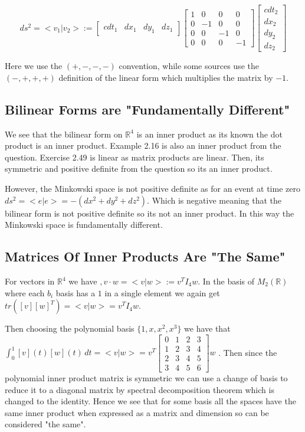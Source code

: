\documentclass{article}
\begin{document}
\begin{equation*}
    ds^2
    = <v_1|v_2>
    :=
    \begin{bmatrix}
        cdt_1 & dx_1 & dy_1 & dz_1
    \end{bmatrix}
    \begin{bmatrix}
        1 & 0 & 0 & 0 \\
        0 & -1 & 0 & 0 \\
        0 & 0 & -1 & 0 \\
        0 & 0 & 0 & -1
    \end{bmatrix}
    \begin{bmatrix}
        cdt_2 \\ dx_2 \\ dy_2 \\ dz_2
    \end{bmatrix}
\end{equation*}

Here we use the $(+,-,-,-)$ convention, while some sources\cite{Mink} use the $(-,+,+,+)$ definition of the linear form which multiplies the matrix by $-1$.

\subsection*{Bilinear Forms are "Fundamentally Different"}
We see that the bilinear form on $\mathbb{R}^4$ is an inner product as its known the dot product is an inner product. Example 2.16 is also an inner product from the question. Exercise 2.49 is linear as matrix products are linear. Then, its symmetric and positive definite from the question so its an inner product.

However, the Minkowski space is not positive definite as for an event at time zero $ds^2 = <e|e> = - (dx^2+dy^2+dz^2)$. Which is negative meaning that the bilinear form is not positive definite so its not an inner product. In this way the Minkowski space is fundamentally different.

\subsection*{Matrices Of Inner Products Are "The Same"}
For vectors in $\mathbb{R}^4$ we have $, v \cdot w = <v|w> := v^T I_4 w$. 
In the basis of $M_2(\mathbb{R})$ where each $b_i$ basis has a $1$ in a single element we again get $tr([v][w]^T) = <v|w> = v^T I_4 w$.


Then choosing the polynomial basis $\{ 1,x,x^2,x^3 \}$ we have that $\int_0^1 [v](t)[w](t)\,dt = <v|w> = v^T \begin{bmatrix}
    0&1&2&3\\1&2&3&4\\2&3&4&5\\3&4&5&6
\end{bmatrix} w$ \cite{Wolf}. Then since the polynomial inner product matrix is symmetric we can use a change of basis to reduce it to a diagonal matrix by spectral decomposition theorem which is changed to the identity\cite{GTP}. Hence we see that for some basis all the spaces have the same inner product when expressed as a matrix and dimension so can be considered "the same".
\end{document}
